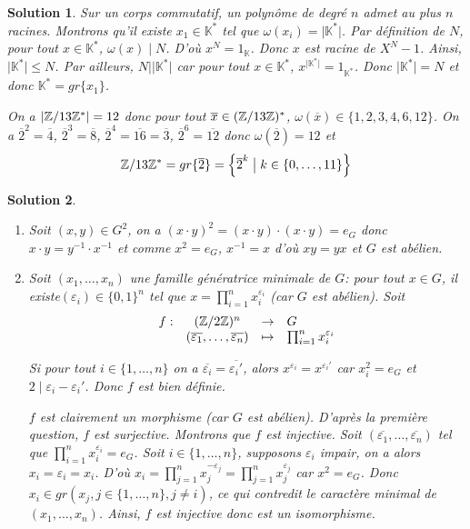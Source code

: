 \documentclass[12pt]{article}
\newtheorem{solution}{Solution}[section]
\theoremstyle{remark}
\newcommand{\K}{\mathbb{K}} \newcommand{\R}{\mathbb{R}}
\newcommand{\function}[5]{
	$$
	\begin{array}{rccl}
		#1: & #2 & \to & #3 \\
		& #4 & \mapsto & #5
	\end{array}
	$$
}
\numberwithin{equation}{section}
\begin{document}
\begin{solution}
	Sur un corps commutatif, un polynôme de degré $n$ admet au plus $n$ racines. Montrons qu'il existe $x_{1}\in\K^{*}$ tel que $\omega(x_{i})=\vert\K^{*}\vert$. Par définition de $N$, pour tout $x\in\K^{*}$, $\omega(x)\mid N$. D'où $x^{N}=1_{\K}$. Donc $x$ est racine de $X^{N}-1$. Ainsi, $\vert\K^{*}\vert\leqslant N$. Par ailleurs, $N\mid\vert\K^{*}\vert$ car pour tout $x\in\K^{*}$, $x^{\vert\K^{*}\vert}=1_{\K^{*}}$. Donc $\vert\K^{*}\vert=N$ et donc $\K^{*}=gr\{x_{1}\}$.

	On a $\vert\mathbb{Z}/13\mathbb{Z}^{*}\vert=12$ donc pour tout $\overline{x}\in(\mathbb{Z}/13\mathbb{Z})^{*}$, $\omega(\overline{x})\in\{1,2,3,4,6,12\}$. On a $\overline{2}^{2}=\overline{4}$, $\overline{2}^{3}=\overline{8}$, $\overline{2}^{4}=\overline{16}=\overline{3}$, $\overline{2}^{6}=\overline{12}$ donc $\omega(\overline{2})=12$ et 
	$$\mathbb{Z}/13\mathbb{Z}^{*}=gr\{\overline{2}\}=\Bigl\{\overline{2}^{k}\bigm| k\in\{0,\dots,11\}\Bigr\}$$
\end{solution}

\begin{solution}
	\phantom{}
	\begin{enumerate}
		\item Soit $(x,y)\in G^{2}$, on a $(x\cdot y)^{2}=(x\cdot y)\cdot (x\cdot y)=e_{G}$ donc $x\cdot y=y^{-1}\cdot x^{-1}$ et comme $x^{2}=e_{G}$, $x^{-1}=x$ d'où $xy=yx$ et $G$ est abélien.
		
		\item Soit $(x_{1},\dots,x_{n})$ une famille génératrice minimale de $G$: pour tout $x\in G$, il existe$(\varepsilon_{i})\in\{0,1\}^{n}$ tel que $x=\prod_{i=1}^{n}x_{i}^{\varepsilon_{i}}$ (car $G$ est abélien).
		Soit \function{f}{(\Z/2\Z)^{n}}{G}{(\overline{\varepsilon_{1}},\dots,\overline{\varepsilon_{n}})}{\prod_{i=1}^{n}x_{i}^{\varepsilon_{i}}}
		Si pour tout $i\in\{1,\dots,n\}$ on a $\overline{\varepsilon_{i}}=\overline{\varepsilon_{i}'}$, alors $x^{\varepsilon_{i}}=x^{\varepsilon_{i}'}$ car $x_{i}^{2}=e_{G}$ et $2\mid\varepsilon_{i}-\varepsilon_{i}'$. Donc $f$ est bien définie.

		$f$ est clairement un morphisme (car $G$ est abélien). D'après la première question, $f$ est surjective. Montrons que $f$ est injective. Soit $(\overline{\varepsilon_{1}},\dots,\overline{\varepsilon_{n}})$ tel que $\prod_{i=1}^{n}x_{i}^{\varepsilon_{i}}=e_{G}$. Soit $i\in\{1,\dots,n\}$, supposons $\varepsilon_{i}$ impair, on a alors $x_{i}=\varepsilon_{i}=x_{i}$. D'où $x_{i}=\prod_{j=1}^{n}x_{j}^{-\varepsilon_{j}}=\prod_{j=1}^{n}x_{j}^{\varepsilon_{j}}$ car $x^{2}=e_{G}$. Donc $x_{i}\in gr(x_{j},j\in\{1,\dots,n\}, j\neq i)$, ce qui contredit le caractère minimal de $(x_{1},\dots,x_{n})$. Ainsi, $f$ est injective donc est un isomorphisme.
	\end{enumerate}
\end{solution}
\end{document}
